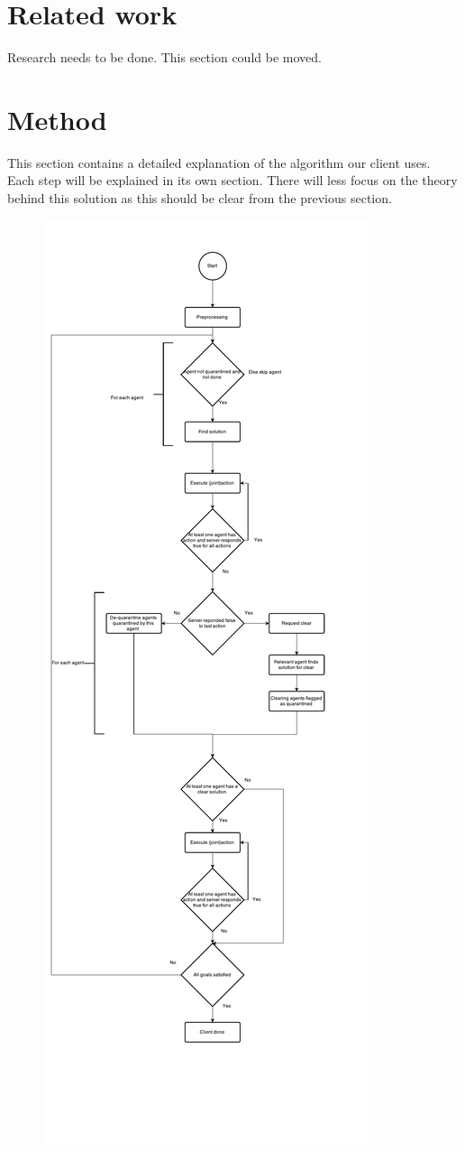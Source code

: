 \documentclass[letterpaper]{article}
\begin{document}
\section{Related work}
Research needs to be done. This section could be moved.

\section{Method}
This section contains a detailed explanation of the algorithm our client uses. Each step will be explained in its own section. There will less focus on the theory behind this solution as this should be clear from the previous section.

\begin{figure}[!htb]
\centering
\includegraphics[scale=0.45]{ClientFlowchart.pdf}

\end{figure}
\end{document}
